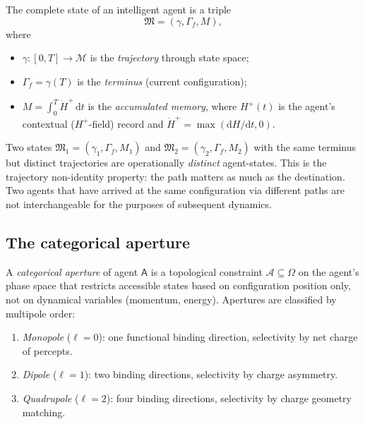 \documentclass[11pt,twocolumn,a4paper]{article}
\newcommand{\M}{\mathcal{M}}
\newcommand{\Aper}{\mathcal{A}}
\newcommand{\Mode}{\mathfrak{M}}
\newcommand{\agent}{\mathsf{A}}
\newcommand{\dd}{\,\mathrm{d}}
\begin{document}
\begin{definition}\label{def:psychon}
The complete state of an intelligent agent is a triple
\[
\Mode=(\gamma,\Gamma_f,M),
\]
where
\begin{itemize}[leftmargin=*]
\item $\gamma:[0,T]\to\M$ is the \emph{trajectory} through state space;
\item $\Gamma_f=\gamma(T)$ is the \emph{terminus} (current
configuration);
\item $M=\int_0^T\dot{H}^+\dd t$ is the \emph{accumulated memory},
where $H^+(t)$ is the agent's contextual ($H^+$-field) record and
$\dot{H}^+=\max(\mathrm{d}H/\mathrm{d}t,0)$.
\end{itemize}
\end{definition}

\begin{remark}\label{rem:psyc-nonident}
Two states $\Mode_1=(\gamma_1,\Gamma_f,M_1)$ and
$\Mode_2=(\gamma_2,\Gamma_f,M_2)$ with the same terminus but distinct
trajectories are operationally \emph{distinct} agent-states. This is
the trajectory non-identity property: the path matters as much as the
destination. Two agents that have arrived at the same configuration via
different paths are not interchangeable for the purposes of subsequent
dynamics.
\end{remark}

\subsection{The categorical aperture}

\begin{definition}[Aperture]\label{def:aper}
A \emph{categorical aperture} of agent $\agent$ is a topological
constraint $\Aper\subseteq\Omega$ on the agent's phase space that
restricts accessible states based on configuration position only, not
on dynamical variables (momentum, energy). Apertures are classified by
multipole order:
\begin{enumerate}[label=(\alph*),leftmargin=*]
\item \emph{Monopole} ($\ell=0$): one functional binding direction,
selectivity by net charge of percepts.
\item \emph{Dipole} ($\ell=1$): two binding directions, selectivity by
charge asymmetry.
\item \emph{Quadrupole} ($\ell=2$): four binding directions, selectivity
by charge geometry matching.
\end{enumerate}
\end{definition}
\end{document}
